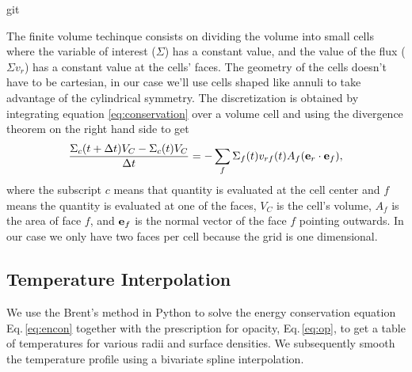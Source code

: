 git\documentclass{article}
\begin{document}
The finite volume techinque consists on dividing the volume into small cells where the variable of interest ($\Sigma$) has a constant value,
and the value of the flux ($\Sigma v_r$) has a constant value at the cells' faces. The geometry of the cells doesn't have to be cartesian, in
our case we'll use cells shaped like annuli to take advantage of the cylindrical symmetry.
The discretization is obtained by integrating equation \ref{eq:conservation} over a volume cell and using the divergence theorem on the
right hand side to get
\begin{equation} \label{eq:discretization}
\frac{\Sigma_c(t+\Delta t) V_C - \Sigma_c(t) V_C}{\Delta t} =
-\sum_{f} \Sigma_{f}(t) v_{rf}(t) A_{f} (\bold{e}_r \cdot \bold{e}_{f}),
\end{equation}
where the subscript $c$ means that quantity is evaluated at the cell center and $f$ means the quantity is evaluated at one of the faces,
$V_C$ is the cell's volume, $A_f$ is the area of face $f$, and $\bold{e}_{f}$ is the normal vector of the face $f$ pointing outwards.
In our case we only have two faces per cell because the grid is one 
dimensional.

\subsection{Temperature Interpolation}
We use the Brent's method in Python to solve the energy conservation equation Eq.\,\ref{eq:encon} together with the prescription for opacity, Eq.\,\ref{eq:op}, to get a table of temperatures for various radii and surface densities. We subsequently smooth the temperature profile using a bivariate spline interpolation. 
\end{document}
